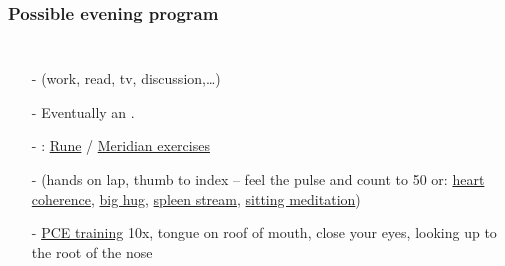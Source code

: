 \begin{frame}
\frametitle{Possible evening program}
\begin{columns}[c] %

\begin{itemize}
\item[-]  (work, read, tv, discussion,\ldots)
\item[-] Eventually an .
\item[-] : \underline{Rune} / \underline{Meridian exercises}
\item[-]  (hands on lap, thumb to index -- feel the pulse and count to 50 or: \underline{heart coherence}, \underline{big hug}, 
\underline{spleen stream}, %
\underline{sitting meditation}) 
\item[-] \underline{PCE training} 10x, tongue on roof of mouth, close your eyes, looking up to the root of the nose
\end{itemize}
\end{columns}
\end{frame}
